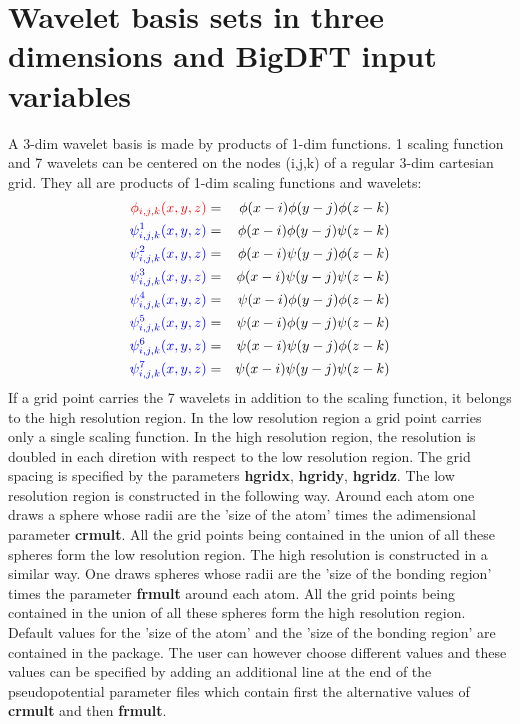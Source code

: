 \documentclass[a4paper,11pt]{report}
\begin{document}
\section{Wavelet basis sets in three dimensions and BigDFT input variables}
A 3-dim wavelet basis is made by products of 1-dim functions.
 {\color{red} 1  scaling function} and {\color{blue} 7 wavelets} 
can be centered on the nodes (i,j,k) of a regular 3-dim cartesian grid.
They all are products of 1-dim scaling functions and wavelets:
\begin{eqnarray*}
 {\color{red} \phi_{i,j,k}(x,y,z) }  & = & \phi(x-i) \phi(y-j) \phi(z-k)   \\
 {\color{blue} \psi^1_{i,j,k}(x,y,z) } & = & \phi(x-i) \phi(y-j) \psi(z-k)  \\
 {\color{blue} \psi^2_{i,j,k}(x,y,z) } & = & \phi(x-i) \psi(y-j) \phi(z-k)  \\
 {\color{blue} \psi^3_{i,j,k}(x,y,z) } & = & \phi(x-i) \psi(y-j) \psi(z-k)  \\
 {\color{blue} \psi^4_{i,j,k}(x,y,z) } & = & \psi(x-i) \phi(y-j) \phi(z-k)  \\
 {\color{blue} \psi^5_{i,j,k}(x,y,z) } & = & \psi(x-i) \phi(y-j) \psi(z-k)  \\
 {\color{blue} \psi^6_{i,j,k}(x,y,z) } & = & \psi(x-i) \psi(y-j) \phi(z-k)  \\
 {\color{blue} \psi^7_{i,j,k}(x,y,z) } & = & \psi(x-i) \psi(y-j) \psi(z-k)  \\
\end{eqnarray*}
If a grid point carries the 7 {\color{blue} wavelets} in addition to the {\color{red} scaling function}, it belongs 
to the high resolution region. In the low resolution region a grid point carries only 
a single {\color{red} scaling function}. In the high resolution region, the resolution is doubled 
in each diretion with respect to the low resolution region. The grid spacing is specified by the parameters
{\bf hgridx}, {\bf hgridy}, {\bf hgridz}. The low resolution region is constructed in the following way. Around each 
atom one draws a sphere whose radii are the 'size of the atom' times the adimensional parameter {\bf crmult}. All the grid 
points being contained in the union of all these spheres form the low resolution region. The high resolution is 
constructed in a similar way. One draws spheres whose radii are the 'size of the bonding region' times the 
parameter {\bf frmult} around each atom.  All the grid points being contained in the union of all these spheres 
form the high resolution region. Default values for the 'size of the atom' and  the 'size of the bonding region' 
are contained in the package. The user can however choose different values and these values can be specified by 
adding an additional line at the end of the pseudopotential parameter files which contain first the alternative 
values of {\bf crmult} and then {\bf frmult}.
\end{document}
